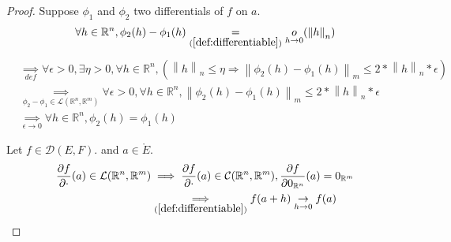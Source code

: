 \documentclass[11pt,en]{elegantpaper}
\newcommand{\norm}[1]{\left\lVert#1\right\rVert}
\newcommand{\Real}{\mathbb{R}}
\begin{document}
\begin{proof}
  Suppose $\phi_1$ and $\phi_2$ two differentials of $f$ on $a$. \begin{equation*}
    \begin{gathered}
      \forall h \in \Real^n, \phi_2(h) - \phi_1(h) \underset{(\ref{def:differentiable})} = \underset{h \to 0}o(\norm h _n)
    \end{gathered}
  \end{equation*}
  \begin{equation*}
    \begin{split}
      & \underset{def} \implies \forall \epsilon > 0, \exists \eta > 0, \forall h \in \Real^n, (\norm h _n \leq \eta \Rightarrow \norm{\phi_2(h) - \phi_1(h)}_m \leq 2 * \norm h _n * \epsilon) \\
      & \underset{\phi_2 - \phi_1 \in \mathcal{L}(\Real^n,\Real^m)} \implies \forall \epsilon > 0, \forall h \in \Real^n, \norm{\phi_2(h) - \phi_1(h)}_m \leq 2 * \norm h _n * \epsilon \\
      & \underset{\epsilon \to 0} \implies \forall h \in \Real^n, \phi_2(h) = \phi_1(h)
    \end{split}
  \end{equation*}
  
  Let $f \in \mathcal{D}(E,F).$ and $a \in \mathring{E}$. \begin{equation*}
    \begin{split}
      \frac{\partial f}{\partial \cdot}(a) \in \mathcal{L}(\Real^n,\Real^m) & \implies \frac{\partial f}{\partial \cdot}(a) \in \mathcal{C}(\Real^n,\Real^m), \frac{\partial f}{\partial 0_{\Real^n}}(a) = 0_{\Real^m} \label{} \\
      & \underset{(\ref{def:differentiable})} \implies f(a + h) \underset{h \to 0} \to f(a)
    \end{split}
  \end{equation*}
\end{proof}
\end{document}
